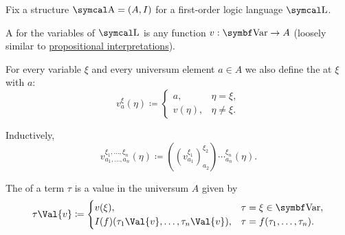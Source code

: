 \begin{definition}\label{def:first_order_valuation}
  Fix a structure \( \CA = (A, I) \) for a first-order logic language \( \CL \).

  \begin{DefEnum}
     A  for the variables of \( \CL \) is any function \( v: \Bold{Var} \to A \) (loosely similar to \hyperref[def:propositional_valuation/interpretation]{propositional interpretations}).

     For every variable \( \xi \) and every universum element \( a \in A \) we also define the  at \( \xi \) with \( a \):
    \begin{equation*}
      v_a^\xi(\eta) \coloneqq \begin{cases}
        a,    &\eta = \xi, \\
        v(\eta), &\eta \neq \xi.
      \end{cases}
    \end{equation*}

    Inductively\IND,
    \begin{equation*}
      v_{a_1, \ldots, a_n}^{\xi_1, \ldots, \xi_n}(\eta) \coloneqq ((v_{a_1}^{\xi_1})_{a_2}^{\xi_2})\cdots_{a_n}^{\xi_n}(\eta).
    \end{equation*}

     The  of a term \( \tau \) is a value in the universum \( A \) given by
    \begin{equation}\label{eq:def:first_order_valuation/term_valuation}
      \tau\Val{v} \coloneqq \begin{cases}
        v(\xi),                                     &\tau = \xi \in \Bold{Var}, \\
        I(f)(\tau_1\Val{v}, \ldots, \tau_n\Val{v}), &\tau = f(\tau_1, \ldots, \tau_n).
      \end{cases}
    \end{equation}


\end{DefEnum}
\end{definition}
